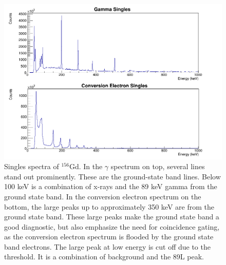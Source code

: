 \begin{figure}[!]
    \centering
    \includegraphics[scale=0.4]{156GdTablesAndFigs/156Gd_Singles.png}
    \caption{Singles spectra of $^{156}$Gd. In the $\gamma$ spectrum on top, several lines stand out prominently. These are the ground-state band lines. Below 100 keV is a combination of x-rays and the 89 keV gamma from the ground state band. In the conversion electron spectrum on the bottom, the large peaks up to approximately 350 keV are from the ground state band. These large peaks make the ground state band a good diagnostic, but also emphasize the need for coincidence gating, as the conversion electron spectrum is flooded by the ground state band electrons. The large peak at low energy is cut off due to the threshold. It is a combination of background and the 89L peak.}
    \label{fig:156_Singles}
\end{figure}